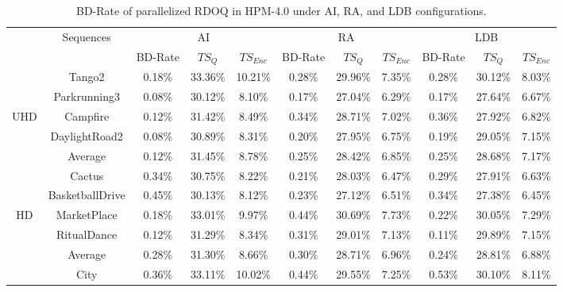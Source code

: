 \documentclass[lettersize,journal]{IEEEtran}
\begin{document}
\begin{table}[!h]
	\caption{BD-Rate of parallelized RDOQ in HPM-4.0 under AI, RA, and LDB configurations.}
    \label{tab:BD-Rate}
	\centering
	\tabcolsep 8pt  %
	\arrayrulewidth 0.75pt
	\begin{tabular}{c | c | c   c   c | c   c   c | c   c   c } 
		\midrule[0.75pt] \specialrule{0em}{0.35pt}{0.35pt} \midrule[0.75pt] %
		\multirow{2}{*}{Class} & \multirow{2}{*}{Sequences} & \multicolumn{3}{c|}{AI} & \multicolumn{3}{c|}{RA} & \multicolumn{3}{c}{LDB} \\ 
		\cmidrule[0.75pt]{3-11} 
		       &                & BD-Rate & $TS_{Q}$ & $TS_{Enc}$ & BD-Rate & $TS_{Q}$ & $TS_{Enc}$ & BD-Rate & $ TS_{Q}$ & $TS_{Enc}$  \\   
		\cmidrule[0.75pt]{1-11}  
		       & Tango2         & 0.18\% & 33.36\% &10.21\% & 0.28\% & 29.96\% & 7.35\% & 0.28\% & 30.12\% & 8.03\% \\ 
		       & Parkrunning3   & 0.08\% & 30.12\% & 8.10\% & 0.17\% & 27.04\% & 6.29\% & 0.17\% & 27.64\% & 6.67\% \\  
		   UHD & Campfire       & 0.12\% & 31.42\% & 8.49\% & 0.34\% & 28.71\% & 7.02\% & 0.36\% & 27.92\% & 6.82\% \\           
	           & DaylightRoad2  & 0.08\% & 30.89\% & 8.31\% & 0.20\% & 27.95\% & 6.75\% & 0.19\% & 29.05\% & 7.15\% \\   
	    \cmidrule[0.75pt]{2-11} 
	           & Average        & 0.12\% & 31.45\% & 8.78\% & 0.25\% & 28.42\% & 6.85\% & 0.25\% & 28.68\% & 7.17\% \\ 
	    \cmidrule[0.75pt]{1-11}  
	           & Cactus         & 0.34\% & 30.75\% & 8.22\% & 0.21\% & 28.03\% & 6.47\% & 0.29\% & 27.91\% & 6.63\% \\          
	           & BasketballDrive& 0.45\% & 30.13\% & 8.12\% & 0.23\% & 27.12\% & 6.51\% & 0.34\% & 27.38\% & 6.45\% \\  
	      HD   & MarketPlace    & 0.18\% & 33.01\% & 9.97\% & 0.44\% & 30.69\% & 7.73\% & 0.22\% & 30.05\% & 7.29\% \\                    
	           & RitualDance    & 0.12\% & 31.29\% & 8.34\% & 0.31\% & 29.01\% & 7.13\% & 0.11\% & 29.89\% & 7.15\% \\   
	    \cmidrule[0.75pt]{2-11} 
	           & Average        & 0.28\% & 31.30\% & 8.66\% & 0.30\% & 28.71\% & 6.96\% & 0.24\% & 28.81\% & 6.88\% \\ 
	    \cmidrule[0.75pt]{1-11}  
	           & City           & 0.36\% & 33.11\% &10.02\% & 0.44\% & 29.55\% & 7.25\% & 0.53\% & 30.10\% & 8.11\% \\          

\end{tabular}
\end{table}
\end{document}
